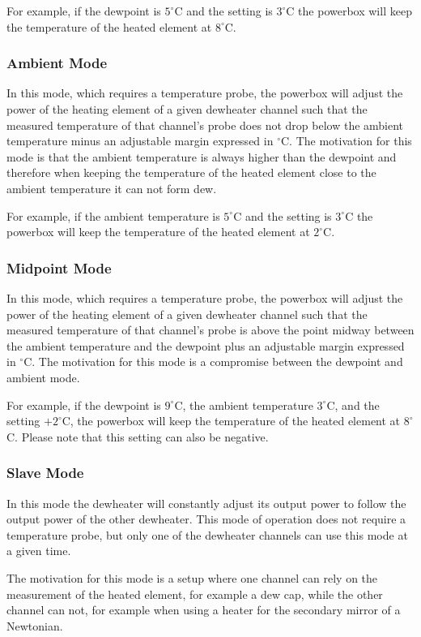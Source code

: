 \documentclass{scrartcl}
\begin{document}
For example, if the dewpoint is $5^{\circ}$C and the setting is $3^{\circ}$C the
powerbox will keep the temperature of the heated element at $8^{\circ}$C.

\subsubsection{Ambient Mode}
In this mode, which requires a temperature probe, the powerbox will adjust the
power of the heating element of a given dewheater channel such that the measured
temperature of that channel's probe does not drop below the ambient temperature
minus an adjustable margin expressed in $^{\circ}$C. The motivation for this
mode is that the ambient temperature is always higher than the dewpoint and
therefore when keeping the temperature of the heated element close to the
ambient temperature it can not form dew.

For example, if the ambient temperature is $5^{\circ}$C and the setting is
$3^{\circ}$C the powerbox will keep the temperature of the heated element at
$2^{\circ}$C.

\subsubsection{Midpoint Mode}
In this mode, which requires a temperature probe, the powerbox will adjust the
power of the heating element of a given dewheater channel such that the measured
temperature of that channel's probe is above the point midway between the
ambient temperature and the dewpoint plus an adjustable margin expressed in
$^{\circ}$C. The motivation for this mode is a compromise between the dewpoint
and ambient mode.

For example, if the dewpoint is $9^{\circ}$C, the ambient temperature
$3^{\circ}$C, and the setting $+2^{\circ}$C, the powerbox will keep the
temperature of the heated element at $8^{\circ}$C. Please note that this setting
can also be negative.

\subsubsection{Slave Mode}
In this mode the dewheater will constantly adjust its output power to follow the
output power of the other dewheater. This mode of operation does not require a
temperature probe, but only one of the dewheater channels can use this mode at a
given time.

The motivation for this mode is a setup where one channel can rely on the
measurement of the heated element, for example a dew cap, while the other
channel can not, for example when using a heater for the secondary mirror of a
Newtonian.
\end{document}
